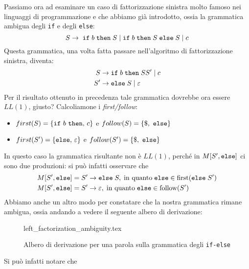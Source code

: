 \documentclass[class=book, crop=false, oneside, 12pt]{standalone}
\begin{document}
Passiamo ora ad esaminare un caso di fattorizzazione sinistra molto famoso nei linguaggi di programmazione e che abbiamo già introdotto, ossia la grammatica ambigua degli \texttt{if} e degli \texttt{else}:
\begin{equation*}
    S \rightarrow \; \textrm{\texttt{if}} \; b \; \textrm{\texttt{then}} \; S \mid \textrm{\texttt{if}} \; b \; \textrm{\texttt{then}} \; S \; \textrm{\texttt{else}} \; S \mid c  
\end{equation*}
Questa grammatica, una volta fatta passare nell'algoritmo di fattorizzazione sinistra, diventa:
\begin{align*}
    S &\rightarrow \textrm{\texttt{if}} \; b \; \textrm{\texttt{then}} \; SS' \mid c \\
    S' &\rightarrow \textrm{\texttt{else}} \; S \mid \varepsilon
\end{align*}
Per il risultato ottenuto in precedenza tale grammatica dovrebbe ora essere \(LL(1)\), giusto? Calcoliamone i \emph{first/follow}: 
\begin{itemize}
    \item \(first(S) = \{\textrm{\texttt{if} } b \textrm{ \texttt{then}, } c\}\) e \(follow(S) = \{\$, \textrm{ \texttt{else}}\}\)
    \item \(first(S') = \{\textrm{\texttt{else}, } \varepsilon\}\) e \(follow(S') = \{\$, \textrm{ \texttt{else}}\}\)
\end{itemize}  
In questo caso la grammatica risultante non è \(LL(1)\), perché in \(M[S', \textrm{\texttt{else}}]\) ci sono due produzioni: si può infatti osservare che 
\begin{align*}
    M[S', \textrm{\texttt{else}}] &= S' \rightarrow \textrm{\texttt{else}} \; S, \; \textrm{in quanto} \; \textrm{\texttt{else}} \in \textrm{first}(\textrm{\texttt{else}} \; S') \\
    M[S', \textrm{\texttt{else}}] &= S' \to \varepsilon, \; \textrm{in quanto} \; \textrm{\texttt{else}} \in \textrm{follow}(S')
\end{align*}
Abbiamo anche un altro modo per constatare che la nostra grammatica rimane ambigua, ossia andando a vedere il seguente albero di derivazione:
\begin{figure}[H]
    \centering
    {left_factorization_ambiguity.tex}
    \caption{Albero di derivazione per una parola sulla grammatica degli \texttt{if-else}}
    \label{leftFactorizationAmbiguity}
\end{figure}

Si può infatti notare che
\end{document}
